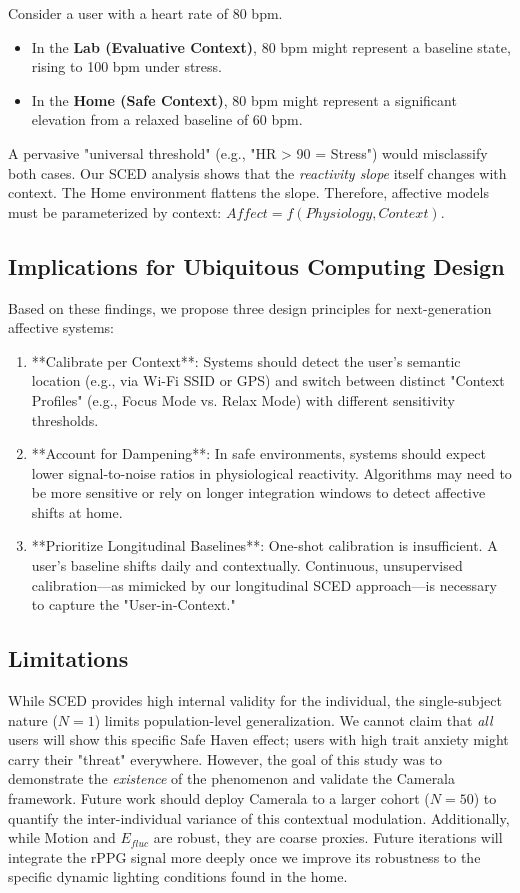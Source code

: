 Consider a user with a heart rate of 80 bpm. 
\begin{itemize}
    \item In the \textbf{Lab (Evaluative Context)}, 80 bpm might represent a baseline state, rising to 100 bpm under stress.
    \item In the \textbf{Home (Safe Context)}, 80 bpm might represent a significant elevation from a relaxed baseline of 60 bpm.
\end{itemize}
A pervasive "universal threshold" (e.g., "HR > 90 = Stress") would misclassify both cases. Our SCED analysis shows that the \textit{reactivity slope} itself changes with context. The Home environment flattens the slope. Therefore, affective models must be parameterized by context: $Affect = f(Physiology, Context)$.

\subsection{Implications for Ubiquitous Computing Design}
Based on these findings, we propose three design principles for next-generation affective systems:

\begin{enumerate}
    \item **Calibrate per Context**: Systems should detect the user's semantic location (e.g., via Wi-Fi SSID or GPS) and switch between distinct "Context Profiles" (e.g., Focus Mode vs. Relax Mode) with different sensitivity thresholds.
    \item **Account for Dampening**: In safe environments, systems should expect lower signal-to-noise ratios in physiological reactivity. Algorithms may need to be more sensitive or rely on longer integration windows to detect affective shifts at home.
    \item **Prioritize Longitudinal Baselines**: One-shot calibration is insufficient. A user's baseline shifts daily and contextually. Continuous, unsupervised calibration—as mimicked by our longitudinal SCED approach—is necessary to capture the "User-in-Context."
\end{enumerate}

\subsection{Limitations}
While SCED provides high internal validity for the individual, the single-subject nature ($N=1$) limits population-level generalization. We cannot claim that \textit{all} users will show this specific Safe Haven effect; users with high trait anxiety might carry their "threat" everywhere. However, the goal of this study was to demonstrate the \textit{existence} of the phenomenon and validate the Camerala framework. Future work should deploy Camerala to a larger cohort ($N=50$) to quantify the inter-individual variance of this contextual modulation.
Additionally, while Motion and $E_{fluc}$ are robust, they are coarse proxies. Future iterations will integrate the rPPG signal more deeply once we improve its robustness to the specific dynamic lighting conditions found in the home.

